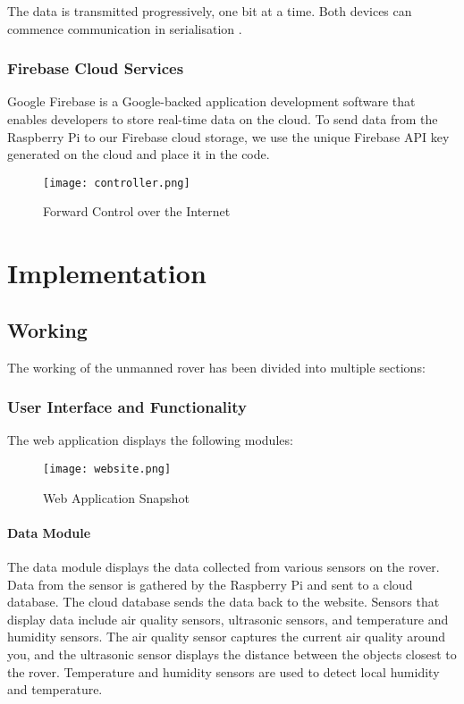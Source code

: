 \documentclass[conference,a4paper]{IEEEtran}
\begin{document}
The data is transmitted progressively, one bit at a time. Both devices can commence communication in serialisation \cite{17}.

\subsubsection{Firebase Cloud Services}
Google Firebase is a Google-backed application development software that enables developers to store real-time data on the cloud. To send data from the Raspberry Pi to our Firebase cloud storage, we use the unique Firebase API key generated on the cloud and place it in the code.

\begin{figure}[ht]
\centering
\texttt{[image: controller.png]}
\caption{Forward Control over the Internet}
\label{Fig: Control}
\end{figure}

\section{Implementation}

\subsection{Working}
The working of the unmanned rover has been divided into multiple sections:

\subsubsection{User Interface and Functionality}
The web application displays the following modules:
\begin{figure*}[ht]
\centering
\texttt{[image: website.png]}
\caption{Web Application Snapshot}
\label{Fig: Web}
\end{figure*}

\paragraph{Data Module}
The data module displays the data collected from  various sensors on the rover. Data from the sensor is gathered by the Raspberry Pi and sent to a cloud database. The cloud database  sends the data back to the website. Sensors that display data include air quality sensors, ultrasonic sensors, and temperature and humidity sensors. The air quality sensor captures the current air quality around you, and the ultrasonic sensor displays the distance between the  objects closest to the rover. Temperature and humidity sensors are used to detect local humidity and temperature.
\end{document}
